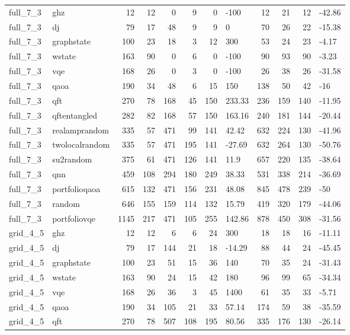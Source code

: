 \begin{longtable}{llrrrrrlrrrl}
full\_7\_3 & ghz & 12 & 12 & 0 & 9 & 0 & -100 & 12 & 21 & 12 & -42.86 \\
full\_7\_3 & dj & 79 & 17 & 48 & 9 & 9 & 0 & 70 & 26 & 22 & -15.38 \\
full\_7\_3 & graphstate & 100 & 23 & 18 & 3 & 12 & 300 & 53 & 24 & 23 & -4.17 \\
full\_7\_3 & wstate & 163 & 90 & 0 & 6 & 0 & -100 & 90 & 93 & 90 & -3.23 \\
full\_7\_3 & vqe & 168 & 26 & 0 & 3 & 0 & -100 & 26 & 38 & 26 & -31.58 \\
full\_7\_3 & qaoa & 190 & 34 & 48 & 6 & 15 & 150 & 138 & 50 & 42 & -16 \\
full\_7\_3 & qft & 270 & 78 & 168 & 45 & 150 & 233.33 & 236 & 159 & 140 & -11.95 \\
full\_7\_3 & qftentangled & 282 & 82 & 168 & 57 & 150 & 163.16 & 240 & 181 & 144 & -20.44 \\
full\_7\_3 & realamprandom & 335 & 57 & 471 & 99 & 141 & 42.42 & 632 & 224 & 130 & -41.96 \\
full\_7\_3 & twolocalrandom & 335 & 57 & 471 & 195 & 141 & -27.69 & 632 & 264 & 130 & -50.76 \\
full\_7\_3 & su2random & 375 & 61 & 471 & 126 & 141 & 11.9 & 657 & 220 & 135 & -38.64 \\
full\_7\_3 & qnn & 459 & 108 & 294 & 180 & 249 & 38.33 & 531 & 338 & 214 & -36.69 \\
full\_7\_3 & portfolioqaoa & 615 & 132 & 471 & 156 & 231 & 48.08 & 845 & 478 & 239 & -50 \\
full\_7\_3 & random & 646 & 155 & 159 & 114 & 132 & 15.79 & 419 & 320 & 179 & -44.06 \\
full\_7\_3 & portfoliovqe & 1145 & 217 & 471 & 105 & 255 & 142.86 & 878 & 450 & 308 & -31.56 \\
grid\_4\_5 & ghz & 12 & 12 & 6 & 6 & 24 & 300 & 18 & 18 & 16 & -11.11 \\
grid\_4\_5 & dj & 79 & 17 & 144 & 21 & 18 & -14.29 & 88 & 44 & 24 & -45.45 \\
grid\_4\_5 & graphstate & 100 & 23 & 51 & 15 & 36 & 140 & 70 & 35 & 24 & -31.43 \\
grid\_4\_5 & wstate & 163 & 90 & 24 & 15 & 42 & 180 & 96 & 99 & 65 & -34.34 \\
grid\_4\_5 & vqe & 168 & 26 & 36 & 3 & 45 & 1400 & 61 & 35 & 33 & -5.71 \\
grid\_4\_5 & qaoa & 190 & 34 & 105 & 21 & 33 & 57.14 & 174 & 59 & 38 & -35.59 \\
grid\_4\_5 & qft & 270 & 78 & 507 & 108 & 195 & 80.56 & 335 & 176 & 130 & -26.14 \\

\end{longtable}
